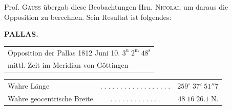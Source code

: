 \par\indent Prof. \textsc{Gauss} übergab diese Beobachtungen Hrn. \textsc{Nicolai}, um daraus die Opposition zu berechnen.
Sein Resultat ist folgendes:
\clearpage
\endgroup
\begingroup
\pagestyle{empty}
\newcommand{\GaussVICitation}[2]{%
  \begin{center}
  \parbox{#1\linewidth}{%
    \centering\footnotesize\frenchspacing
    \hrule height .3pt\relax\vspace{2.5pt}
    #2\par
    \vspace{2.5pt}\hrule height .3pt\relax
  }%
  \end{center}
  \par\nobreak\medskip
}
\newcommand{\GaussVIGathering}[2]{%
  \fancypagestyle{gaussVIGathering}{%
    \fancyhf{}%
    \renewcommand{\headrulewidth}{0pt}%
    \renewcommand{\footrulewidth}{0pt}%
    \fancyfoot[C]{\makebox[\textwidth][l]{%
      \hspace*{.025\textwidth}{\footnotesize\bfseries #1}\hfill
      {\normalsize\bfseries\textls[90]{#2}}\hspace*{.18\textwidth}}}%
  }%
  \thispagestyle{gaussVIGathering}%
}
\thispagestyle{empty}
\noindent{}%
\makebox[12mm][l]{}%
\parbox[t]{\dimexpr\linewidth-24mm\relax}{\centering\footnotesize\bfseries PALLAS.\par}%
\par\nobreak\medskip
\begin{center}\fontsize{10}{12}\selectfont\setlength{\tabcolsep}{0pt}\renewcommand{\arraystretch}{1.15}\begin{tabular}{l}
Opposition der Pallas 1812 Juni 10. $3^{\mathrm u}\;2^{\mathrm m}\;48^{\mathrm s}$\\mittl. Zeit im Meridian von Göttingen
\end{tabular}\end{center}
\begin{center}\fontsize{10}{12}\selectfont\setlength{\tabcolsep}{2pt}\renewcommand{\arraystretch}{1.15}\begin{tabular}{lcr}
Wahre Länge & $.\;.\;.\;.\;.\;.\;.\;.\;.\;.\;.\;.\;.\;.\;.\;.\;.\;.$ & $259^\circ\;37'\;51''7$\\
Wahre geocentrische Breite & $.\;.\;.\;.\;.\;.\;.\;.\;.\;.\;.\;.\;.$ & $48\;16\;26.1\;\mathrm{N}.$\\
\end{tabular}\end{center}

